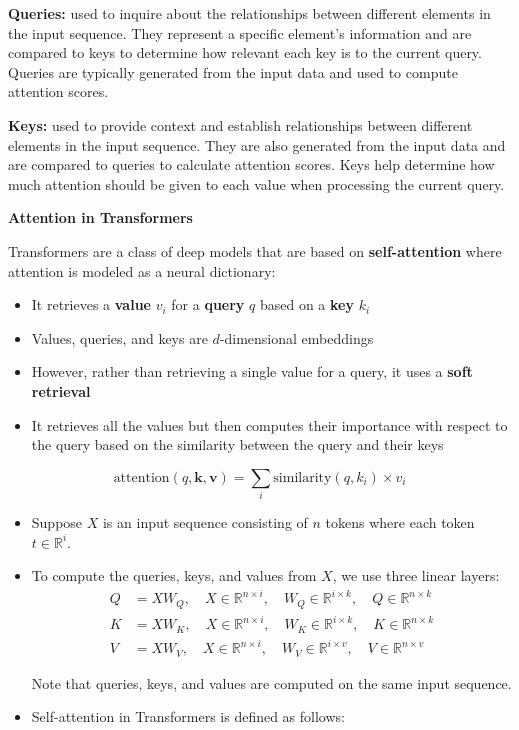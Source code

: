\begin{definition}
    \textbf{Queries:} used to inquire about the relationships between different elements in the input sequence. They represent a specific element's information and are compared to keys to determine how relevant each key is to the current query. Queries are typically generated from the input data and used to compute attention scores.
\end{definition}

\begin{definition}
    \textbf{Keys:} used to provide context and establish relationships between different elements in the input sequence. They are also generated from the input data and are compared to queries to calculate attention scores. Keys help determine how much attention should be given to each value when processing the current query.
\end{definition}

\noindent
\textbf{Attention in Transformers}

Transformers are a class of deep models that are based on \textbf{self-attention} where attention is modeled as a neural dictionary:
\begin{itemize}
    \item It retrieves a \textbf{value} $v_i$ for a \textbf{query} $q$ based on a \textbf{key} $k_i$
    \item Values, queries, and keys are $d$-dimensional embeddings
    \item However, rather than retrieving a single value for a query, it uses a \textbf{soft retrieval}
    \item It retrieves all the values but then computes their importance with respect to the query based on the similarity between the query and their keys
\end{itemize}

\[\text{attention}(q, \textbf{k}, \textbf{v}) = \sum_{i}\text{similarity}(q, k_i) \times v_i \]

\begin{itemize}
    \item Suppose $X$ is an input sequence consisting of $n$ tokens where each token $t \in \mathbb{R}^i$.
    \item To compute the queries, keys, and values from $X$, we use three linear layers:
\begin{align*}
    Q &= XW_Q, \quad X \in \mathbb{R}^{n \times i}, \quad W_Q \in \mathbb{R}^{i \times k}, \quad Q \in \mathbb{R}^{n \times k} \\
    K &= XW_K, \quad X \in \mathbb{R}^{n \times i}, \quad W_K \in \mathbb{R}^{i \times k}, \quad K \in \mathbb{R}^{n \times k} \\
    V &= XW_V, \quad X \in \mathbb{R}^{n \times i}, \quad W_V \in \mathbb{R}^{i \times v}, \quad V \in \mathbb{R}^{n \times v}
\end{align*}

Note that queries, keys, and values are computed on the same input sequence.
\item Self-attention in Transformers is defined as follows:

\end{itemize}

